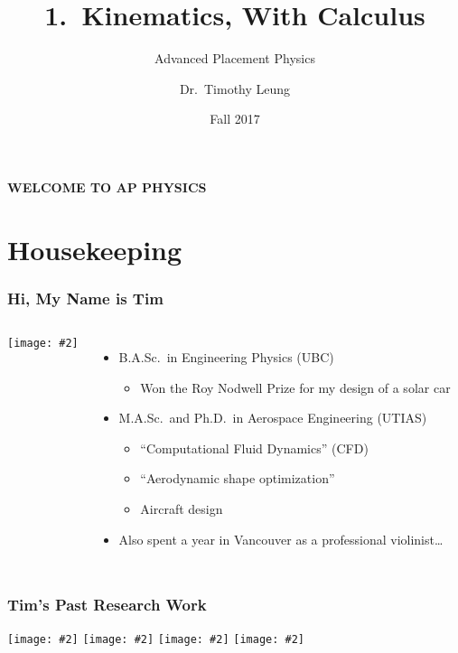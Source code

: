 \documentclass[12pt,compress,aspectratio=169]{beamer}
\title{1.\ Kinematics, With Calculus}
\subtitle{Advanced Placement Physics}
\author[TML]{Dr.\ Timothy Leung}
\institute{Olympiads School}
\date{Fall 2017}
\newcommand{\pic}[2]{\texttt{[image: \#2]}}
\begin{document}
\begin{frame}
  \frametitle{}
  {\LARGE
    \begin{center}
      \textbf{WELCOME TO AP PHYSICS}
    \end{center}
  }
\end{frame}


\section{Housekeeping}

\begin{frame}
  \frametitle{Hi, My Name is Tim}
  \begin{columns}

    \pic{1}{tim.jpg}
    
    \begin{itemize}
    \item B.A.Sc.\ in Engineering Physics (UBC)
      \begin{itemize}
      \item Won the Roy Nodwell Prize for my design of a solar car
      \end{itemize}
    \item M.A.Sc.\ and Ph.D.\ in Aerospace Engineering (UTIAS)
      \begin{itemize}
      \item ``Computational Fluid Dynamics'' (CFD)
      \item ``Aerodynamic shape optimization''
      \item Aircraft design
      \end{itemize}
    \item Also spent a year in Vancouver as a professional violinist\ldots
    \end{itemize}
  \end{columns}
\end{frame}



\begin{frame}
  \frametitle{Tim's Past Research Work}
  \begin{center}
    \pic{0.25}{view-grid-original-1024x899.jpg}\hspace{0.01in}
    \pic{0.25}{view-grid-final-1024x899.jpg}\hspace{0.01in}
    \pic{0.225}{flowsolution-original-1024x1000.jpg}\hspace{0.01in}
    \pic{0.225}{flowsolution-deformed-1024x1000.jpg}
  \end{center}
\end{frame}
\end{document}
